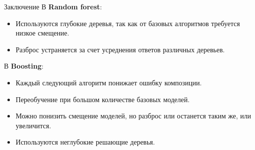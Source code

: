 \documentclass[notheorems, handout]{beamer}
\begin{document}
\begin{frame}{Заключение}
	В \textbf{Random forest}:
	\begin{itemize}
		\item Используются глубокие деревья, так как от базовых алгоритмов требуется низкое смещение.
		\item Разброс устраняется за счет усреднения ответов различных деревьев.
	\end{itemize}
	\par\smallskip
	В \textbf{Boosting}:
	\begin{itemize}
		\item Каждый следующий алгоритм понижает ошибку композиции.
		\item Переобучение при большом количестве базовых моделей.
		\item Можно понизить смещение моделей, но разброс или останется таким же, или увеличится.
		\item Используются неглубокие решающие деревья.
	\end{itemize}
\end{frame}
\end{document}
